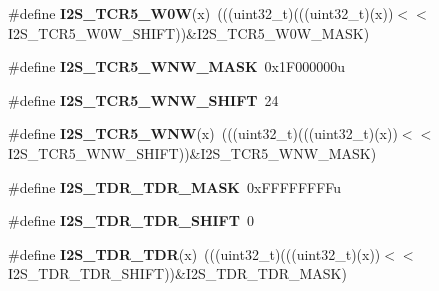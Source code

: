 \begin{DoxyCompactItemize}
\item 
\#define {\bfseries I2\+S\+\_\+\+T\+C\+R5\+\_\+\+W0W}(x)~(((uint32\+\_\+t)(((uint32\+\_\+t)(x))$<$$<$I2\+S\+\_\+\+T\+C\+R5\+\_\+\+W0\+W\+\_\+\+S\+H\+I\+FT))\&I2\+S\+\_\+\+T\+C\+R5\+\_\+\+W0\+W\+\_\+\+M\+A\+SK)\hypertarget{group__I2S__Register__Masks_ga5b0a26e0153652855de151bbbc7e8303}{}\label{group__I2S__Register__Masks_ga5b0a26e0153652855de151bbbc7e8303}

\item 
\#define {\bfseries I2\+S\+\_\+\+T\+C\+R5\+\_\+\+W\+N\+W\+\_\+\+M\+A\+SK}~0x1\+F000000u\hypertarget{group__I2S__Register__Masks_gac7d0e32e2822b95984bd4c98097848e0}{}\label{group__I2S__Register__Masks_gac7d0e32e2822b95984bd4c98097848e0}

\item 
\#define {\bfseries I2\+S\+\_\+\+T\+C\+R5\+\_\+\+W\+N\+W\+\_\+\+S\+H\+I\+FT}~24\hypertarget{group__I2S__Register__Masks_ga76459cafce1757f4ea37a3fca81514a7}{}\label{group__I2S__Register__Masks_ga76459cafce1757f4ea37a3fca81514a7}

\item 
\#define {\bfseries I2\+S\+\_\+\+T\+C\+R5\+\_\+\+W\+NW}(x)~(((uint32\+\_\+t)(((uint32\+\_\+t)(x))$<$$<$I2\+S\+\_\+\+T\+C\+R5\+\_\+\+W\+N\+W\+\_\+\+S\+H\+I\+FT))\&I2\+S\+\_\+\+T\+C\+R5\+\_\+\+W\+N\+W\+\_\+\+M\+A\+SK)\hypertarget{group__I2S__Register__Masks_ga875934bf1e82a195cf9bd7414c9deac1}{}\label{group__I2S__Register__Masks_ga875934bf1e82a195cf9bd7414c9deac1}

\item 
\#define {\bfseries I2\+S\+\_\+\+T\+D\+R\+\_\+\+T\+D\+R\+\_\+\+M\+A\+SK}~0x\+F\+F\+F\+F\+F\+F\+F\+Fu\hypertarget{group__I2S__Register__Masks_gaa3e1fe9a61d8485d2d6968dfcf779502}{}\label{group__I2S__Register__Masks_gaa3e1fe9a61d8485d2d6968dfcf779502}

\item 
\#define {\bfseries I2\+S\+\_\+\+T\+D\+R\+\_\+\+T\+D\+R\+\_\+\+S\+H\+I\+FT}~0\hypertarget{group__I2S__Register__Masks_gacf46b25f4f14b34413430bc2071c1a13}{}\label{group__I2S__Register__Masks_gacf46b25f4f14b34413430bc2071c1a13}

\item 
\#define {\bfseries I2\+S\+\_\+\+T\+D\+R\+\_\+\+T\+DR}(x)~(((uint32\+\_\+t)(((uint32\+\_\+t)(x))$<$$<$I2\+S\+\_\+\+T\+D\+R\+\_\+\+T\+D\+R\+\_\+\+S\+H\+I\+FT))\&I2\+S\+\_\+\+T\+D\+R\+\_\+\+T\+D\+R\+\_\+\+M\+A\+SK)\hypertarget{group__I2S__Register__Masks_gabe6f8f2157a35e011d88193360f25f94}{}\label{group__I2S__Register__Masks_gabe6f8f2157a35e011d88193360f25f94}


\end{DoxyCompactItemize}
